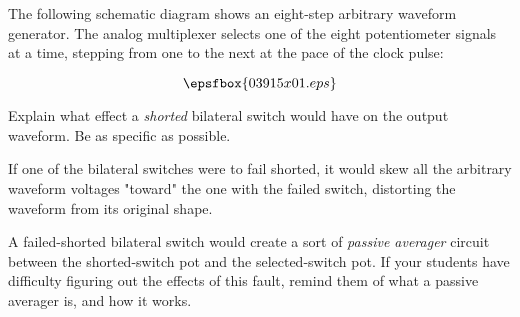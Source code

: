 

The following schematic diagram shows an eight-step arbitrary waveform generator.  The analog multiplexer selects one of the eight potentiometer signals at a time, stepping from one to the next at the pace of the clock pulse:

$$\epsfbox{03915x01.eps}$$

Explain what effect a {\it shorted} bilateral switch would have on the output waveform.  Be as specific as possible.







If one of the bilateral switches were to fail shorted, it would skew all the arbitrary waveform voltages "toward" the one with the failed switch, distorting the waveform from its original shape. 







A failed-shorted bilateral switch would create a sort of {\it passive averager} circuit between the shorted-switch pot and the selected-switch pot.  If your students have difficulty figuring out the effects of this fault, remind them of what a passive averager is, and how it works.




